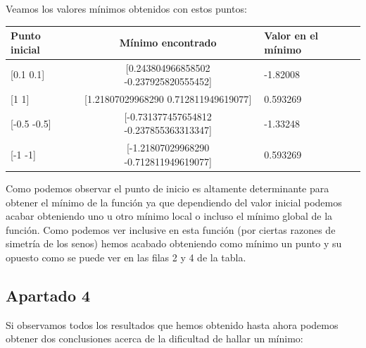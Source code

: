 \documentclass[12pt,a4paper]{article}
\begin{document}
Veamos los valores mínimos obtenidos con estos puntos:

\begin{table}[H]
	\begin{tabular}{|l|c|l|}
		\hline
		{\textbf{Punto inicial}} & {\textbf{Mínimo encontrado}}            & {\textbf{Valor en el mínimo}} \\ \hline \hline
		{[}0.1 0.1{]}                & {[}0.243804966858502 -0.237925820555452{]}  & -1.82008                          \\ \hline
		{[}1 1{]}                    & {[}1.21807029968290 0.712811949619077{]}    & 0.593269                          \\ \hline
		{[}-0.5 -0.5{]}              & {[}-0.731377457654812 -0.237855363313347{]} & -1.33248                          \\ \hline
		{[}-1 -1{]}                  & {[}-1.21807029968290 -0.712811949619077{]}  & 0.593269                          \\ \hline
	\end{tabular}
\end{table}

Como podemos observar el punto de inicio es altamente determinante para obtener el mínimo de la función ya que dependiendo del valor inicial podemos acabar obteniendo uno u otro mínimo local o incluso el mínimo global de la función. Como podemos ver inclusive en esta función (por ciertas razones de simetría de los senos) hemos acabado obteniendo como mínimo un punto y su opuesto como se puede ver en las filas 2 y 4 de la tabla.

\subsection{Apartado 4}

Si observamos todos los resultados que hemos obtenido hasta ahora podemos obtener dos conclusiones acerca de la dificultad de hallar un mínimo:
\end{document}
